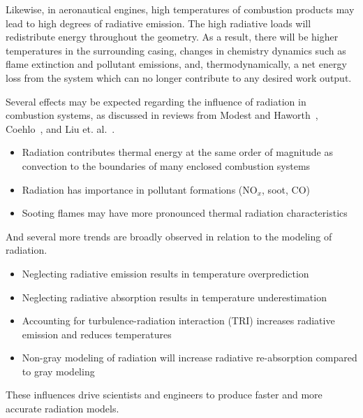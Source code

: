 Likewise, in aeronautical engines, high temperatures of combustion products may lead to high degrees of radiative emission.
The high radiative loads will redistribute energy throughout the geometry. As a result, there will be higher temperatures in the surrounding casing, changes in chemistry dynamics such as flame extinction and pollutant emissions, and, thermodynamically, a net energy loss from the system which can no longer contribute to any desired work output.

Several effects may be expected regarding the influence of radiation in combustion systems, as discussed in reviews from Modest and Haworth~\cite{Modest2016RadiativeSystems}, Coehlo~\cite{Coelho2018RadiativeSystems}, and Liu et. al.~\cite{Liu2020TheFlames}.
\begin{itemize}
    \item Radiation contributes thermal energy at the same order of magnitude as convection to the boundaries of many enclosed combustion systems~\cite{Gamil2020AssessmentChamber,Johnson2021AnalysisMethod}
    \item Radiation has importance in pollutant formations (NO${}_x$, soot, CO)~\cite{Ihme2008ModelingFormulation,Habibi2007TurbulenceFlames}
    \item Sooting flames may have more pronounced thermal radiation characteristics
\end{itemize}
And several more trends are broadly observed in relation to the modeling of radiation.
\begin{itemize}
    \item Neglecting radiative emission results in temperature overprediction~\cite{Gamil2020AssessmentChamber}
    \item Neglecting radiative absorption results in temperature underestimation
    \item Accounting for turbulence-radiation interaction (TRI) increases radiative emission and reduces temperatures
    \item Non-gray modeling of radiation will increase radiative re-absorption compared to gray modeling~\cite{Wu2021LimitationsFires}
\end{itemize}

These influences drive scientists and engineers to produce faster and more accurate radiation models. 






